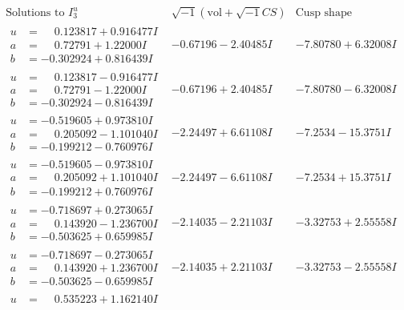 \documentclass[1p]{elsarticle_modified}
\theoremstyle{definition}
\newcommand{\I}{\sqrt{-1}}
\begin{document}
$$\begin{array}{c|c|c}  
\text{Solutions to }I^u_{3}& \I (\text{vol} + \sqrt{-1}CS) & \text{Cusp shape}\\
 \hline 
\begin{aligned}
u &= \phantom{-}0.123817 + 0.916477 I \\
a &= \phantom{-}0.72791 + 1.22000 I \\
b &= -0.302924 + 0.816439 I\end{aligned}
 & -0.67196 - 2.40485 I & -7.80780 + 6.32008 I \\ \hline\begin{aligned}
u &= \phantom{-}0.123817 - 0.916477 I \\
a &= \phantom{-}0.72791 - 1.22000 I \\
b &= -0.302924 - 0.816439 I\end{aligned}
 & -0.67196 + 2.40485 I & -7.80780 - 6.32008 I \\ \hline\begin{aligned}
u &= -0.519605 + 0.973810 I \\
a &= \phantom{-}0.205092 - 1.101040 I \\
b &= -0.199212 - 0.760976 I\end{aligned}
 & -2.24497 + 6.61108 I & -7.2534 - 15.3751 I \\ \hline\begin{aligned}
u &= -0.519605 - 0.973810 I \\
a &= \phantom{-}0.205092 + 1.101040 I \\
b &= -0.199212 + 0.760976 I\end{aligned}
 & -2.24497 - 6.61108 I & -7.2534 + 15.3751 I \\ \hline\begin{aligned}
u &= -0.718697 + 0.273065 I \\
a &= \phantom{-}0.143920 - 1.236700 I \\
b &= -0.503625 + 0.659985 I\end{aligned}
 & -2.14035 - 2.21103 I & -3.32753 + 2.55558 I \\ \hline\begin{aligned}
u &= -0.718697 - 0.273065 I \\
a &= \phantom{-}0.143920 + 1.236700 I \\
b &= -0.503625 - 0.659985 I\end{aligned}
 & -2.14035 + 2.21103 I & -3.32753 - 2.55558 I \\ \hline\begin{aligned}
u &= \phantom{-}0.535223 + 1.162140 I \\

\end{aligned}
\end{array}$$
\end{document}
